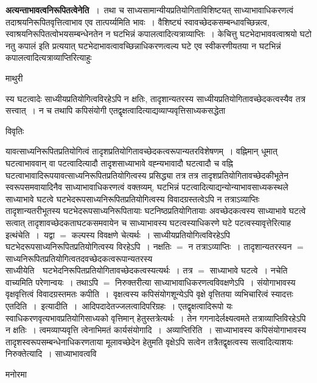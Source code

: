 \documentclass[10pt, openany]{book}
\begin{document}
{\textbf{\qt अत्यन्ताभावत्वनिरूपितत्वेनेति~}।~तथा च साध्यसामान्यीयप्रतियोगिताविशिष्टयत् साध्याभावाधिकरणत्वं तदाश्रयनिरूपितवृत्तित्वाभाव एव तात्पर्य्यमिति भावः~।
वैशिष्ट्यं स्वावच्छेदकसम्बन्धावच्छिन्नत्व, स्वाश्रयनिरूपितत्वोभयसम्बन्धेनतेन न घटभिन्नं कपालत्वादित्यत्राव्याप्तिः~। केचित्तु  घटभेदाभाववत्वाश्रयो घटो नतु कपालं इति प्रत्ययात् घटभेदाभावत्वावच्छिन्नाधिकरणत्वल्य घटे एव स्वीकरणीयतया न घटभिन्नं कपालत्वादित्यत्राव्याप्तिरित्याहुः
\newpage
\begin{center}  माथुरी  \end{center}
{\la स्य घटत्वादेः साध्यीयप्रतियोगित्वविरहेऽपि न क्षतिः, तादृशान्यतरस्य साध्यीयप्रतियोगितावच्छेदकत्वस्यैव तत्र सत्त्वात्~। न च तथापि कपिसंयोगी एतद्वृक्षत्वादित्याद्यव्याप्यवृत्तिसाध्यकसद्धेता}
\begin{center}     विवृतिः \end{center}
यावत्साध्यनिरूपितप्रतियोगित्वं तादृशप्रतियोगितावच्छेदकत्वरूपान्यतरविशेषणम्~। वह्निमान् धूमात् घटत्वाभाववान् वा पटत्वादित्यादौ तादृशसाध्याभावे वह्न्यभावादौ घटत्वादौ च वह्नि घटत्वाभावादिरूपयावत्साध्यनिरूपितप्रतियोगित्वस्य प्रसिद्ध्या तत्र तत्र तादृशप्रतियोगितावच्छेदकीभूतेन स्वरूपसमवायादिनैव साध्याभावाधिकरणत्वं वक्तव्यम्, घटभिन्नं पटत्वादित्याद्यन्योन्याभावसाध्यकस्थले साध्याभावे घटत्वे घटभेदरूपसाध्यनिरूपितप्रतियोगित्वस्य विवादग्रस्तत्वेऽपि न तत्राऽव्याप्तिः तादृशान्यतरीभूतस्य
घटभेदरूपसाध्यनिरूपितायाः घटनिष्ठप्रतियोगितायाः अवच्छेदकत्वस्य साध्याभावे घटत्वे सत्वात् तादृशावच्छेदकताघटकसमवायेन च साध्याभावस्य घटत्वस्याधिकरणे घटे पटत्वस्यावृत्तेरित्याह \textendash इत्थंचेति~।~यद्वा $=$ कल्पस्य विवक्षणे चेत्यर्थः~। साध्यीयप्रतियोगित्वविरहेऽपि घटभेदरूपसाध्यनिरूपितप्रतियोगित्वस्य विरहेऽपि~। नक्षतिः $=$ न तत्राऽव्याप्तिः~। तादृशान्यतरस्यन $=$ साध्यनिरूपितप्रतियोगित्वतदवच्छेदकत्वरूपान्यतरस्य {\qt साध्यीयेति~}~घटभेदनिरूपितप्रतियोगितावच्छेदकत्वस्यत्यर्थः~। तत्र $=$ साध्याभावे घटत्वे~। नचेति वाच्यमिति परेणान्वयः~। तथाऽपि $=$ निरुक्तरीत्या साध्याभावाधिकरणत्वविवक्षणेऽपि~। संयोगाभावस्य वृक्षवृत्तित्वं विवादग्रस्तमतः {\la कपीति~।}~वृक्षत्वस्य कपिसंयोगशून्येऽपि वृक्षे वृत्तितया व्यभिचारित्वं स्यादत्तः {\qt एतदिति~।~इत्यादीति~।}~आदिपदादेतज्जलत्वादिपरिग्रहः~। एतद्वृक्षत्वादिरूपो यः स्वाधिकरणवृत्यभावप्रतियोगिसाध्यको वृत्तिमान् हेतुस्तत्रेत्यर्थः~। तेन गगनादेर्लक्ष्यत्वमते तत्राव्याप्तिविरहेऽपि न क्षतिः~। त्वमव्याप्यवृत्ति त्वेनाभिमतं कार्यसंयोगादि~।~{\qt अव्याप्तिरिति~।} साध्याभावस्य कपिसंयोगाभावस्य तादृशस्वरूपसम्बन्धेनाधिकरणताया मूलावच्छेदेन हेतुमति  वृक्षेऽपि सत्वेन तत्रैतद्वृक्षत्वस्य सत्वादित्याशयः {\qt निरुक्तेत्यादि~}। साध्याभावत्ववि
\begin{center}   मनोरमा  \end{center}

}
\end{document}
